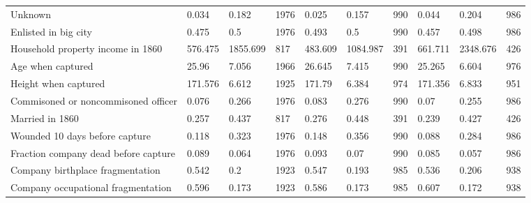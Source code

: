 \documentclass{article}
\begin{document}
\begin{table}
\begin{tabular}{llllllllll}
Unknown                           & 0.034                   & 0.182                                & 1976                                   & 0.025 & 0.157 & 990 & 0.044 & 0.204 & 986 \\
Enlisted in big city              & 0.475                   & 0.5                                  & 1976                                   & 0.493 & 0.5 & 990 & 0.457 & 0.498 & 986 \\
Household property income in 1860 & 576.475                 & 1855.699                             & 817                                    & 483.609 & 1084.987 & 391 & 661.711 & 2348.676 & 426 \\
Age when captured                 & 25.96                   & 7.056                                & 1966                                   & 26.645 & 7.415 & 990 & 25.265 & 6.604 & 976 \\
Height when captured                 & 171.576 & 6.612 & 1925 & 171.79 & 6.384 & 974 & 171.356 & 6.833 & 951 \\
Commisoned or noncommisoned officer  & 0.076   & 0.266 & 1976 & 0.083  & 0.276 & 990 & 0.07    & 0.255 & 986 \\
Married in 1860                      & 0.257   & 0.437 & 817  & 0.276  & 0.448 & 391 & 0.239   & 0.427 & 426 \\
Wounded 10 days before capture       & 0.118   & 0.323 & 1976 & 0.148  & 0.356 & 990 & 0.088   & 0.284 & 986 \\
Fraction company dead before capture & 0.089   & 0.064 & 1976 & 0.093  & 0.07  & 990 & 0.085   & 0.057 & 986 \\
Company birthplace fragmentation     & 0.542   & 0.2   & 1923 & 0.547  & 0.193 & 985 & 0.536   & 0.206 & 938 \\
Company occupational fragmentation   & 0.596   & 0.173 & 1923 & 0.586  & 0.173 & 985 & 0.607   & 0.172 & 938 \\
\end{tabular}
\end{table}
\end{document}
